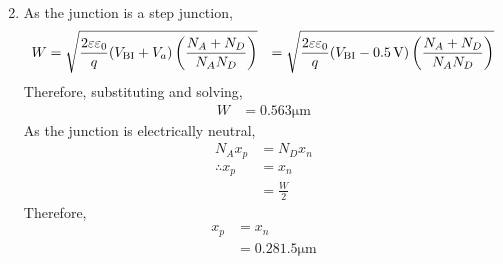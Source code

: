 \documentclass[titlepage, fleqn, a4paper, 12pt, twoside]{article}
\theoremstyle{definition}
\theoremstyle{theorem}
\begin{document}
\begin{solution}
\begin{enumerate}[leftmargin=*]
\begin{align*}
			\end{align*}
		\item
			As the junction is a step junction,
			\begin{align*}
				W & = \sqrt{\frac{2 \varepsilon \varepsilon_0}{q} (V_{\text{BI}} + V_a) \left( \frac{N_A + N_D}{N_A N_D} \right)}
                                  & = \sqrt{\frac{2 \varepsilon \varepsilon_0}{q} (V_{\text{BI}} - 0.5 \volt) \left( \frac{N_A + N_D}{N_A N_D} \right)}
			\end{align*}
			Therefore, substituting and solving,
			\begin{align*}
				W & = 0.563 \si{\micro\metre}
			\end{align*}
			As the junction is electrically neutral,
			\begin{align*}
				N_A x_p        & = N_D x_n \\
				\therefore x_p & = x_n     \\
                                               & = \frac{W}{2}
			\end{align*}
			Therefore,
			\begin{align*}
				x_p & = x_n \\
                                    & = 0.281.5 \si{\micro\metre}
			\end{align*}
	\end{enumerate}
\end{solution}
\end{document}
